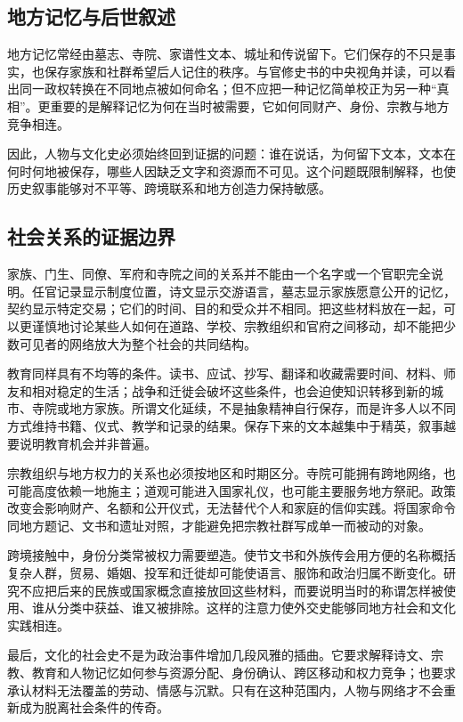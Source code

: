 \subsection{地方记忆与后世叙述}
地方记忆常经由墓志、寺院、家谱性文本、城址和传说留下。它们保存的不只是事实，也保存家族和社群希望后人记住的秩序。与官修史书的中央视角并读，可以看出同一政权转换在不同地点被如何命名；但不应把一种记忆简单校正为另一种“真相”。更重要的是解释记忆为何在当时被需要，它如何同财产、身份、宗教与地方竞争相连。

因此，人物与文化史必须始终回到证据的问题：谁在说话，为何留下文本，文本在何时何地被保存，哪些人因缺乏文字和资源而不可见。这个问题既限制解释，也使历史叙事能够对不平等、跨境联系和地方创造力保持敏感。

\subsection{社会关系的证据边界}
家族、门生、同僚、军府和寺院之间的关系并不能由一个名字或一个官职完全说明。任官记录显示制度位置，诗文显示交游语言，墓志显示家族愿意公开的记忆，契约显示特定交易；它们的时间、目的和受众并不相同。把这些材料放在一起，可以更谨慎地讨论某些人如何在道路、学校、宗教组织和官府之间移动，却不能把少数可见者的网络放大为整个社会的共同结构。

教育同样具有不均等的条件。读书、应试、抄写、翻译和收藏需要时间、材料、师友和相对稳定的生活；战争和迁徙会破坏这些条件，也会迫使知识转移到新的城市、寺院或地方家族。所谓文化延续，不是抽象精神自行保存，而是许多人以不同方式维持书籍、仪式、教学和记录的结果。保存下来的文本越集中于精英，叙事越要说明教育机会并非普遍。

宗教组织与地方权力的关系也必须按地区和时期区分。寺院可能拥有跨地网络，也可能高度依赖一地施主；道观可能进入国家礼仪，也可能主要服务地方祭祀。政策改变会影响财产、名额和公开仪式，无法替代个人和家庭的信仰实践。将国家命令同地方题记、文书和遗址对照，才能避免把宗教社群写成单一而被动的对象。

跨境接触中，身份分类常被权力需要塑造。使节文书和外族传会用方便的名称概括复杂人群，贸易、婚姻、投军和迁徙却可能使语言、服饰和政治归属不断变化。研究不应把后来的民族或国家概念直接放回这些材料，而要说明当时的称谓怎样被使用、谁从分类中获益、谁又被排除。这样的注意力使外交史能够同地方社会和文化实践相连。

最后，文化的社会史不是为政治事件增加几段风雅的插曲。它要求解释诗文、宗教、教育和人物记忆如何参与资源分配、身份确认、跨区移动和权力竞争；也要求承认材料无法覆盖的劳动、情感与沉默。只有在这种范围内，人物与网络才不会重新成为脱离社会条件的传奇。
